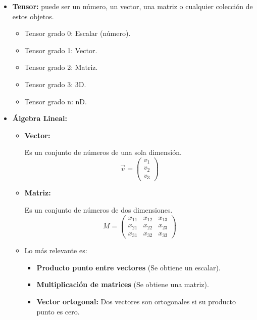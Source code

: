 \documentclass{templateApunte}
\begin{document}
\begin{itemize}
  \item \textbf{Tensor:} puede ser un número, un vector, una matriz o cualquier colección de estos objetos.
  \begin{itemize}
    \item Tensor grado 0: Escalar (número).
    \item Tensor grado 1: Vector.
    \item Tensor grado 2: Matriz.
    \item Tensor grado 3: 3D.
    \item Tensor grado n: nD.
  \end{itemize}
  \item \textbf{Álgebra Lineal:} \hypertarget{algebra}{}
  \begin{itemize}
    \item \hypertarget{vector}{\textbf{Vector:}} Es un conjunto de números de una sola dimensión.
    \begin{equation*}
      \vec{v} =
      \begin{pmatrix}
        v_1 \\
        v_2 \\
        v_3
      \end{pmatrix}
    \end{equation*}

    \item \hypertarget{matriz}{\textbf{Matriz:}} Es un conjunto de números de dos dimensiones.
    \begin{equation*}
      M =
      \begin{pmatrix}
        x_{11} & x_{12} & x_{13} \\
        x_{21} & x_{22} & x_{23} \\
        x_{31} & x_{32} & x_{33}
      \end{pmatrix}
    \end{equation*}

    \item Lo más relevante es:
    \begin{itemize}
      \item \textbf{Producto punto entre vectores} (Se obtiene un escalar).
      
      \item \textbf{Multiplicación de matrices} (Se obtiene una matriz).
      
      \item \textbf{Vector ortogonal:} Dos vectores son ortogonales si su producto punto es cero.
      

\end{itemize}
\end{itemize}
\end{itemize}
\end{document}
